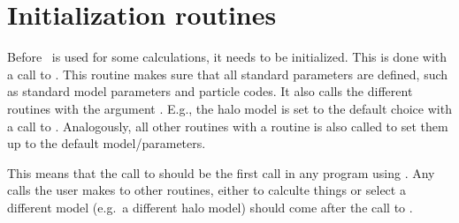 
\section{Initialization routines}

Before \ds\ is used for some calculations, it needs to be
initialized. This is done with a call to . This routine
makes sure that all standard parameters are defined, such as standard
model parameters and particle codes. It also calls the different
 routines with the argument . E.g., the
halo model is set to the default choice with a call to
. Analogously, all other routines
with a  routine is also called to set them up to the
default model/parameters.

This means that the call to  should be the first call in
any program using \ds. Any calls the user makes to other routines,
either to calculte things or select a different model (e.g.\ a
different halo model) should come after the call to .
